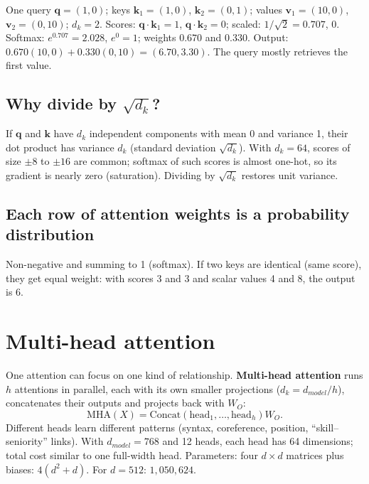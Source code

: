 \begin{example}
One query $\mathbf q = (1, 0)$; keys $\mathbf k_1 = (1, 0)$, $\mathbf k_2 = (0, 1)$; values $\mathbf v_1 = (10, 0)$, $\mathbf v_2 = (0, 10)$; $d_k = 2$.
Scores: $\mathbf q\cdot\mathbf k_1 = 1$, $\mathbf q\cdot\mathbf k_2 = 0$; scaled: $1/\sqrt2 = 0.707$, 0.
Softmax: $e^{0.707} = 2.028$, $e^0 = 1$; weights $0.670$ and $0.330$.
Output: $0.670(10, 0) + 0.330(0, 10) = (6.70, 3.30)$. The query mostly retrieves the first value.
\end{example}

\subsection{Why divide by $\sqrt{d_k}$?}
If $\mathbf q$ and $\mathbf k$ have $d_k$ independent components with mean 0 and variance 1, their dot product has variance $d_k$ (standard deviation
$\sqrt{d_k}$). With $d_k = 64$, scores of size $\pm8$ to $\pm16$ are common; softmax of such scores is almost one-hot, so its gradient is nearly zero
(saturation). Dividing by $\sqrt{d_k}$ restores unit variance.

\subsection{Each row of attention weights is a probability distribution}
Non-negative and summing to 1 (softmax). If two keys are identical (same score), they get equal weight: with scores 3 and 3 and scalar values 4 and 8, the
output is 6.

\section{Multi-head attention}
One attention can focus on one kind of relationship. \textbf{Multi-head attention} runs $h$ attentions in parallel, each with its own smaller projections
($d_k = d_{model}/h$), concatenates their outputs and projects back with $W_O$:
\[ \text{MHA}(X) = \text{Concat}(\text{head}_1,\dots,\text{head}_h)W_O. \]
Different heads learn different patterns (syntax, coreference, position, ``skill--seniority'' links). With $d_{model} = 768$ and 12 heads, each head has 64
dimensions; total cost similar to one full-width head.
Parameters: four $d\times d$ matrices plus biases: $4(d^2 + d)$. For $d = 512$: $1{,}050{,}624$.

